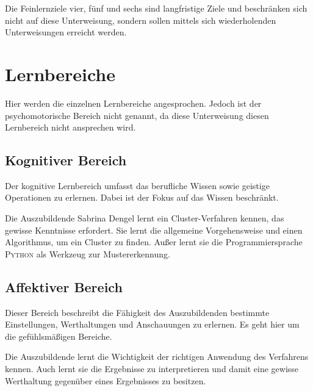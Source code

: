 Die Feinlernziele vier, fünf und sechs sind langfristige Ziele und beschränken sich nicht auf diese Unterweisung, sondern sollen mittels sich wiederholenden Unterweisungen erreicht werden.

\section{Lernbereiche}
Hier werden die einzelnen Lernbereiche angesprochen. Jedoch ist der psychomotorische Bereich nicht genannt, da diese Unterweisung diesen Lernbereich nicht ansprechen wird.

\subsection{Kognitiver Bereich}
Der kognitive Lernbereich umfasst das berufliche Wissen sowie geistige Operationen zu erlernen. Dabei ist der Fokus auf das Wissen beschränkt. 
\par
Die Auszubildende Sabrina Dengel lernt ein Cluster-Verfahren kennen, das gewisse Kenntnisse erfordert. Sie lernt die allgemeine Vorgehensweise und einen Algorithmus, um ein Cluster zu finden. Außer lernt sie die Programmiersprache \textsc{Python} als Werkzeug zur Mustererkennung.

\subsection{Affektiver Bereich}
Dieser Bereich beschreibt die Fähigkeit des Auszubildenden bestimmte Einstellungen, Werthaltungen und Anschauungen zu erlernen. Es geht hier um die gefühlsmäßigen Bereiche.
\par
Die Auszubildende lernt die Wichtigkeit der richtigen Anwendung des Verfahrens kennen. Auch lernt sie die Ergebnisse zu interpretieren und damit eine gewisse Werthaltung gegenüber eines Ergebnisses zu besitzen.


